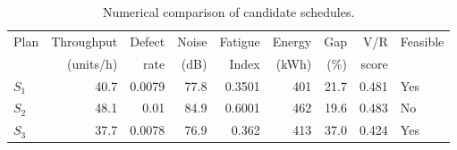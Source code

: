 \begin{table}[htbp]
\centering
\caption{Numerical comparison of candidate schedules.}
\label{tab:numerical-sim}
\small
\begin{tabular}{@{}lrrrrrrrl@{}}
\toprule
Plan & Throughput & Defect & Noise & Fatigue & Energy & Gap & V/R & Feasible \\
     & (units/h)  & rate   & (dB)  & Index   & (kWh)  & (\%) & score &         \\
\midrule
$S_{1}$ & 40.7 & 0.0079 & 77.8 & 0.3501 & 401 & 21.7 & 0.481 & Yes \\
$S_{2}$ & 48.1 & 0.01 & 84.9 & 0.6001 & 462 & 19.6 & 0.483 & No \\
$S_{3}$ & 37.7 & 0.0078 & 76.9 & 0.362 & 413 & 37.0 & 0.424 & Yes \\
\bottomrule
\end{tabular}
\end{table}
